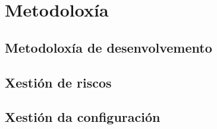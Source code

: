 %
%
\chapter[Metodoloxía]{
	Metodoloxía
	\label{ch.mtd}
}


%
%
\section[Metodoloxía de desenvolvemento]{Metodoloxía de desenvolvemento}

\section[Xestión de riscos]{Xestión de riscos}

\section[Xestión da configuración]{Xestión da configuración}




